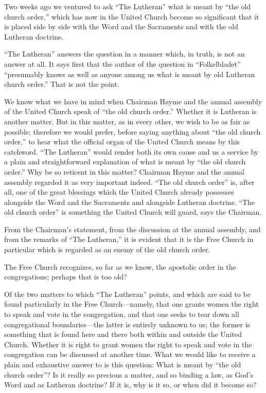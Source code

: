 Two weeks ago we ventured to ask “The Lutheran” what is meant by “the old church order,” which has now in the United Church become so significant that it is placed side by side with the Word and the Sacraments and with the old Lutheran doctrine.

“The Lutheran” answers the question in a manner which, in truth, is not an answer at all. It says first that the author of the question in “Folkelbladet” “presumably knows as well as anyone among us what is meant by old Lutheran church order.” That is not the point.

We know what we have in mind when Chairman Høyme and the annual assembly of the United Church speak of “the old church order.” Whether it is Lutheran is another matter. But in this matter, as in every other, we wish to be as fair as possible; therefore we would prefer, before saying anything about “the old church order,” to hear what the official organ of the United Church means by this catchword. “The Lutheran” would render both its own cause and us a service by a plain and straightforward explanation of what is meant by “the old church order.” Why be so reticent in this matter? Chairman Høyme and the annual assembly regarded it as very important indeed. “The old church order” is, after all, one of the great blessings which the United Church already possesses alongside the Word and the Sacraments and alongside Lutheran doctrine. “The old church order” is something the United Church will guard, says the Chairman.

From the Chairman’s statement, from the discussion at the annual assembly, and from the remarks of “The Lutheran,” it is evident that it is the Free Church in particular which is regarded as an enemy of the old church order.

The Free Church recognizes, so far as we know, the apostolic order in the congregations; perhaps that is too old?

Of the two matters to which “The Lutheran” points, and which are said to be found particularly in the Free Church—namely, that one grants women the right to speak and vote in the congregation, and that one seeks to tear down all congregational boundaries—the latter is entirely unknown to us; the former is something that is found here and there both within and outside the United Church. Whether it is right to grant women the right to speak and vote in the congregation can be discussed at another time. What we would like to receive a plain and exhaustive answer to is this question: What is meant by “the old church order”? Is it really so precious a matter, and so binding a law, as God’s Word and as Lutheran doctrine? If it is, why is it so, or when did it become so?


